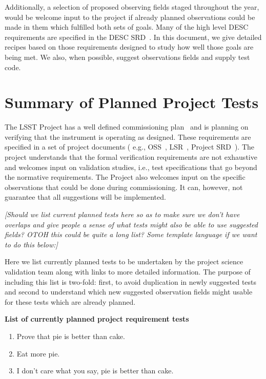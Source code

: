 \documentclass[modern]{desc-tex/styles/lsstdescnote}
\begin{document}
Additionally, a selection of proposed observing fields staged throughout the year, would be welcome input to the project if already planned observations could be made in them which fulfilled both sets of goals.  Many of the high level DESC requirements are specified in the DESC SRD~\cite{DESC-SRD}.  In this document, we  give detailed recipes based on those requirements designed to study how well those goals are being met. We also, when possible, suggest observations fields and supply test code.

\section{Summary of Planned Project Tests}
\label{sec:project-tests}

The LSST Project has a well defined commissioning plan~\cite{LSE-79} and is planning on verifying that the instrument is operating as designed.  These requirements are specified in a set of project documents ( e.g., OSS~\cite{LSE-30}, LSR~\cite{LSE-29}, Project SRD~\cite{LPM-17}). The project understands that the formal verification requirements are not exhaustive and welcomes input on validation studies, i.e., test specifications that go beyond the normative requirements. The Project also welcomes input on the specific observations that could be done during commissioning. It can, however, not guarantee that all suggestions will be implemented.

{\it [Should we list current planned tests here so as to make sure we don't have overlaps and give people a sense of what tests might also be able to use suggested fields?  OTOH this could be quite a long list?  Some template language if we want to do this below:] }

Here we list currently planned tests to be undertaken by the project science validation team along with links to more detailed information.  The purpose of including this list is two-fold: first, to avoid duplication in newly suggested tests and second to understand which new suggested observation fields might usable for these tests which are already planned.

\noindent
{\bf List of currently planned project requirement tests}
\begin{enumerate}
\item Prove that pie is better than cake.
\item Eat more pie.
\item I don't care what you say, pie is better than cake.
\end{enumerate}
\end{document}
